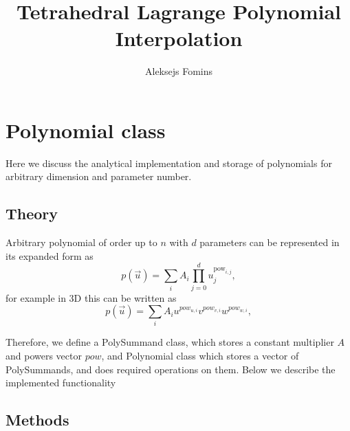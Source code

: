\documentclass[12pt]{article}
\title{Tetrahedral Lagrange Polynomial Interpolation}
\author{Aleksejs Fomins}
\date{}
\begin{document}
 


\maketitle 

\section{Polynomial class}

\noindent
Here we discuss the analytical implementation and storage of polynomials for arbitrary dimension and parameter number.

\subsection{Theory}

Arbitrary polynomial of order up to $n$ with $d$ parameters can be represented in its expanded form as
\[ p(\vec{u}) = \sum_i A_i \prod_{j = 0}^d u_j^{\mathrm{pow}_{i,j}},  \]
for example in 3D this can be written as
\[ p(\vec{u}) = \sum_i A_i u^{pow_{u,i}} v^{pow_{v,i}} w^{pow_{w, i}},  \]

\noindent
Therefore, we define a PolySummand class, which stores a constant multiplier $A$ and powers vector $pow$, and Polynomial class
which stores a vector of PolySummands, and does required operations on them. Below we describe the implemented functionality

\subsection{Methods}
\end{document}
